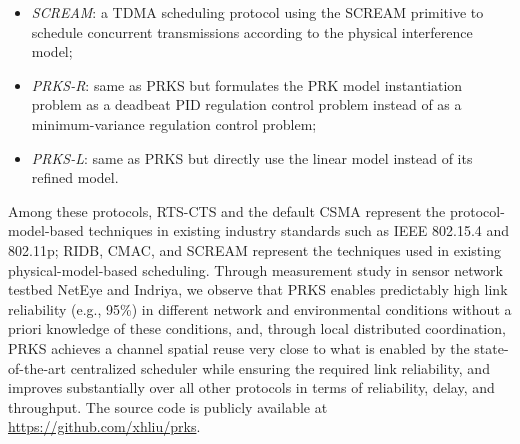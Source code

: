 {\begin{itemize}
\item \emph{SCREAM}: a TDMA scheduling protocol using the SCREAM primitive to schedule concurrent transmissions according to the physical interference model;
\item \emph{PRKS-R}: same as PRKS but formulates the PRK model instantiation problem as a deadbeat PID regulation control problem instead of as a minimum-variance regulation control problem;
\item \emph{PRKS-L}: same as PRKS but directly use the linear model instead of its refined model.
\end{itemize}
Among these protocols, RTS-CTS and the default CSMA represent the protocol-model-based techniques in existing industry standards such as IEEE 802.15.4 and 802.11p; RIDB, CMAC, and SCREAM represent the techniques used in existing physical-model-based scheduling. 
Through measurement study in sensor network testbed NetEye and Indriya, we observe that PRKS enables predictably high link reliability (e.g., 95\%) in different network and environmental conditions without a priori knowledge of these conditions, and, through local distributed coordination, PRKS achieves a channel spatial reuse very close to what is enabled by the state-of-the-art centralized scheduler while ensuring the required link reliability, and improves substantially over all other protocols in terms of reliability, delay, and throughput.
The source code is publicly available at \url{https://github.com/xhliu/prks}.
}


